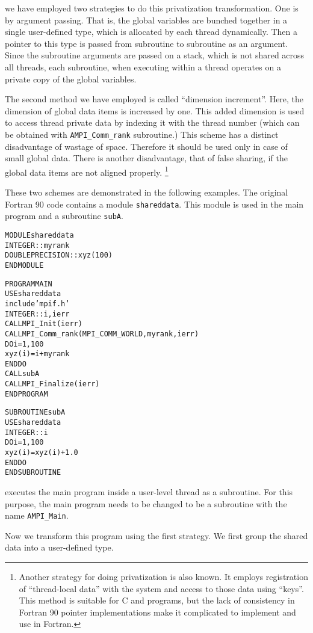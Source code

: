\documentclass[10pt]{article}
\begin{document}
we have employed two strategies to do this privatization transformation. One is
by argument passing. That is, the global variables are bunched together in a
single user-defined type, which is allocated by each thread dynamically. Then a
pointer to this type is passed from subroutine to subroutine as an argument.
Since the subroutine arguments are passed on a stack, which is not shared
across all threads, each subroutine, when executing within a thread operates on
a private copy of the global variables. 

The second method we have employed is called ``dimension increment''. Here, the
dimension of global data items is increased by one. This added dimension is
used to access thread private data by indexing it with the thread number (which
can be obtained with \texttt{AMPI\_Comm\_rank} subroutine.) This scheme has a
distinct disadvantage of wastage of space. Therefore it should be used only in
case of small global data. There is another disadvantage, that of false
sharing, if the global data items are not aligned properly.  \footnote{ Another
strategy for doing privatization is also known. It employs registration of
``thread-local data'' with the system and access to those data using ``keys''.
This method is suitable for C and \CC{} programs, but the lack of consistency
in Fortran 90 pointer implementations make it complicated to implement and use
in Fortran.}

These two schemes are demonstrated in the following examples. The original
Fortran 90 code contains a module \texttt{shareddata}. This module is used in
the main program and a subroutine \texttt{subA}.

\begin{alltt}
MODULE shareddata
  INTEGER :: myrank
  DOUBLE PRECISION :: xyz(100)
END MODULE

PROGRAM MAIN
  USE shareddata
  include 'mpif.h'
  INTEGER :: i, ierr
  CALL MPI_Init(ierr)
  CALL MPI_Comm_rank(MPI_COMM_WORLD, myrank, ierr)
  DO i = 1, 100
    xyz(i) =  i + myrank
  END DO
  CALL subA
  CALL MPI_Finalize(ierr)
END PROGRAM

SUBROUTINE subA
  USE shareddata
  INTEGER :: i
  DO i = 1, 100
    xyz(i) = xyz(i) + 1.0
  END DO
END SUBROUTINE
\end{alltt}

\ampi{} executes the main program inside a user-level thread as a subroutine.
For this purpose, the main program needs to be changed to be a subroutine with
the name \verb+AMPI_Main+.

Now we transform this program using the first strategy. We first group the
shared data into a user-defined type.
\end{document}
